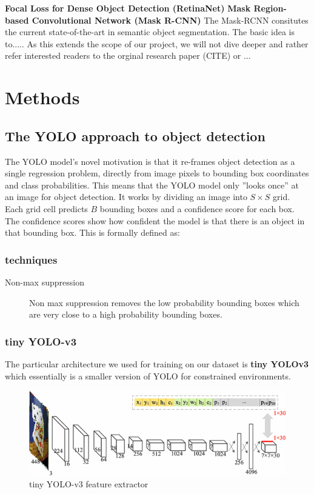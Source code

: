 \documentclass[a4paper]{article}
\begin{document}
\textbf{Focal Loss for Dense Object Detection (RetinaNet)}
\textbf{Mask Region-based Convolutional Network (Mask R-CNN)}
The Mask-RCNN consitutes the current state-of-the-art in semantic object segmentation. The basic idea is to.....
As this extends the scope of our project, we will not dive deeper and rather refer interested readers to the orginal research paper (CITE) or ...
\section{Methods}
\subsection*{The YOLO approach to object detection}
The YOLO model’s novel motivation is that it re-frames
object detection as a single regression problem, directly
from image pixels to bounding box coordinates and class
probabilities. This means that the YOLO model only ”looks
once” at an image for object detection.
It works by dividing an image into $S\times S$ grid. Each grid
cell predicts $B$ bounding boxes and a confidence score for
each box. The confidence scores show how confident the
model is that there is an object in that bounding box. This
is formally defined as:

\subsubsection*{techniques}
\begin{description}
\item[Non-max suppression] Non max suppression removes the low probability bounding boxes which are very close to a high probability bounding boxes.
\end{description}

\subsubsection*{tiny YOLO-v3}

The particular architecture we used for training on our dataset is \textbf{tiny YOLOv3} which essentially is a smaller version of YOLO for constrained environments.
\begin{figure}


\includegraphics[width=1\linewidth]{tinyyolo}
\caption{tiny YOLO-v3 feature extractor}
\end{figure}
\end{document}
